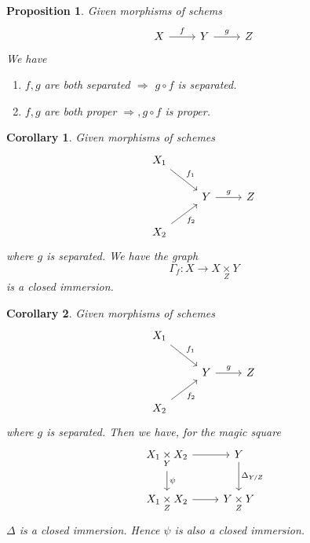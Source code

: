 \documentclass{article}
\newtheorem{proposition}{Proposition}[section]
\newtheorem{corollary}{Corollary}[section]
\numberwithin{equation}{section}
\newcommand{\fib}[1]{%
  \mathbin{\mathop{\times}\limits_{#1}}%
}
\begin{document}
\begin{proposition}
Given morphisms of schems
\[
\begin{tikzcd}
X \arrow[r, "f"] & Y \arrow[r, "g"] & Z
\end{tikzcd}
\]
We have
\begin{enumerate}
\item $f,g$ are both separated $\Rightarrow $ $g\circ f$ is separated.
\item $f,g$ are both proper $\Rightarrow, g\circ f$ is proper.
\end{enumerate}
\end{proposition}

\begin{corollary}
Given morphisms of schemes
\[
\begin{tikzcd}
X_1 \arrow[rd, "f_1"]  &                  &   \\
                       & Y \arrow[r, "g"] & Z \\
X_2 \arrow[ru, "f_2"'] &                  &  
\end{tikzcd}
\]
where $g$ is separated. We have the graph
\begin{equation*}
\Gamma_f:X\to X\fib{Z}Y
\end{equation*}
is a closed immersion.
\end{corollary}

\begin{corollary}
Given morphisms of schemes
\[
\begin{tikzcd}
X_1 \arrow[rd, "f_1"]  &                  &   \\
                       & Y \arrow[r, "g"] & Z \\
X_2 \arrow[ru, "f_2"'] &                  &  
\end{tikzcd}
\]
where $g$ is separated. Then we have, for the magic square
\[
\begin{tikzcd}
X_1\fib{Y}X_2 \arrow[d, "\psi"] \arrow[r] & Y \arrow[d, "\Delta_{Y/Z}"] \\
X_1\fib{Z}X_2 \arrow[r]           & Y\fib{Z}Y                  
\end{tikzcd}
\]
$\Delta$ is a closed immersion. Hence $\psi$ is also a closed immersion.
\end{corollary}
\end{document}
